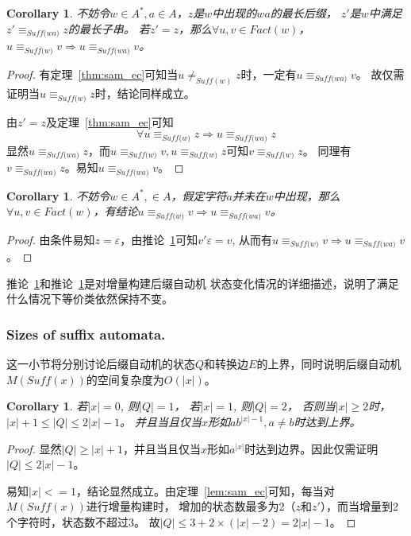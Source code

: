 \documentclass[UTF8]{ctexart}
\newtheorem{cor}[thm]{Corollary}
\theoremstyle{definition}
\theoremstyle{remark}
\numberwithin{equation}{subsection}
\newcommand{\equsuf}[1][x]{\equiv_{\textit{Suff(#1)}}}
\newcommand{\Suff}{\textit{Suff}}
\begin{document}
	\begin{cor}
	\label{cor:z_u_equsuf_v}
		不妨令$w \in A^*, a \in A$，$z$是$w$中出现的$wa$的最长后缀，
		$z'$是$w$中满足$z' \equsuf[wa] z$的最长子串。
		若$z' = z$，那么$\forall u,v \in Fact(w)$，
		$u \equsuf[w] v \Longrightarrow u \equsuf[wa] v$。
	\end{cor}
	\begin{proof}
		有定理~\ref{thm:sam_ec}可知当$u \neq_{\Suff(w)} z$时，一定有$u \equsuf[wa] v$。
		故仅需证明当$u \equsuf[w] z$时，结论同样成立。
		
		由$z' = z$及定理~\ref{thm:sam_ec}可知
		\[
			\forall u \equsuf[w] z \Rightarrow u \equsuf[wa] z
		\]
		显然$u \equsuf[wa] z$，而$u \equsuf[w] v, u \equsuf[w] z$可知$v \equsuf[w] z$。
		同理有$v \equsuf[wa] z$。易知$u \equsuf[wa] v$。
	\end{proof}
	
	\begin{cor}
	\label{cor:a_notin_w}
		不妨令$w \in A^*, \in A$，假定字符$a$并未在$w$中出现，那么
		$\forall u,v \in Fact(w)$，有结论$u \equsuf[w] v \Longrightarrow u \equsuf[wa] v$。
	\end{cor}
	\begin{proof}
		由条件易知$z = \varepsilon$，由推论~\ref{cor:z_u_equsuf_v}可知$v' \varepsilon = v$,
		从而有$u \equsuf[w] v \Longrightarrow u \equsuf[wa] v$。
	\end{proof}
	
	推论~\ref{cor:z_u_equsuf_v}和推论~\ref{cor:a_notin_w}是对增量构建后缀自动机
	状态变化情况的详细描述，说明了满足什么情况下等价类依然保持不变。
	
\subsubsection{Sizes of suffix automata.}
	
	这一小节将分别讨论后缀自动机的状态$Q$和转换边$E$的上界，同时说明后缀自动机$M(\Suff(x))$的空间复杂度为$O(|x|)$。
	
	\begin{cor}
	\label{cor:sz_Q}
		若$|x| = 0$, 则$|Q| = 1$，
		若$|x| = 1$, 则$|Q| = 2$，
		否则当$|x| \ge 2$时，$|x|+1 \le |Q| \le 2|x|-1$。
		并且当且仅当$x$形如$ab^{|x|-1}, a \neq b$时达到上界。
	\end{cor}
	\begin{proof}
		显然$|Q| \ge |x|+1$，并且当且仅当$x$形如$a^{|x|}$时达到边界。因此仅需证明$|Q| \le 2|x|-1$。
		
		易知$|x| <= 1$，结论显然成立。由定理~\ref{lem:sam_ec}可知，每当对$M(\Suff(x))$进行增量构建时，
		增加的状态数最多为2（$z$和$z'$），而当增量到2个字符时，状态数不超过3。
		故$|Q| \le 3 + 2 \times (|x| - 2) = 2|x| - 1$。
	\end{proof}
	
\end{document}
